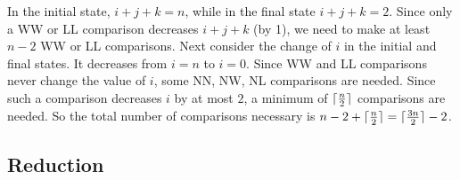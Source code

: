 \documentclass{article}
\begin{document}
\begin{itemize}
In the initial state, $i+j+k=n$, while in the final state 
$i+j+k=2$. Since only a WW or LL comparison decreases $i+j+k$
(by 1), we need to make at least $n-2$ WW or LL comparisons.
Next consider the change of $i$ in the initial and final states.
It decreases from $i=n$ to $i=0$. Since WW and LL comparisons
never change the value of $i$, some NN, NW, NL comparisons are
needed. Since such a comparison decreases $i$ by at most $2$,
a minimum of $\lceil{n\over2}\rceil$ comparisons are needed.
So the total number of comparisons necessary is
$n-2+\lceil{n\over2}\rceil=\lceil{3n\over2}\rceil-2$.
 
\end{itemize}

\newpage

\subsection{Reduction}
\end{document}
